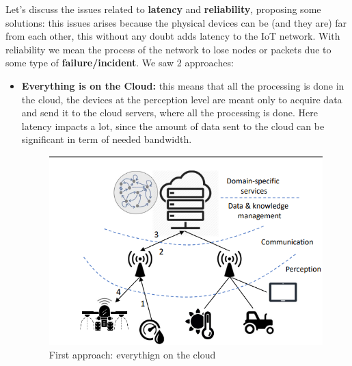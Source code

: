 \documentclass[10pt,a4paper]{report}
\theoremstyle{definition}
\begin{document}
Let's discuss the issues related to \textbf{latency} and \textbf{reliability}, proposing some solutions: this issues arises because the physical devices can be (and they are) far from each other, this without any doubt adds latency to the IoT network. With reliability we mean the process of the network to lose nodes or packets due to some type of \textbf{failure/incident}. We saw 2 approaches:
\begin{itemize}
	\item \textbf{Everything is on the Cloud:} this means that all the processing is done in the cloud, the devices at the perception level are meant only to acquire data and send it to the cloud servers, where all the processing is done. Here latency impacts a lot, since the amount of data sent to the cloud can be significant in term of needed bandwidth.
		\begin{figure}[h]
		\centering
		\includegraphics[scale=0.50]{images/Pasted image 20230222185737.png}
		\caption{First approach: everythign on the cloud}
	\end{figure}
			
	
	

\end{itemize}
\end{document}
